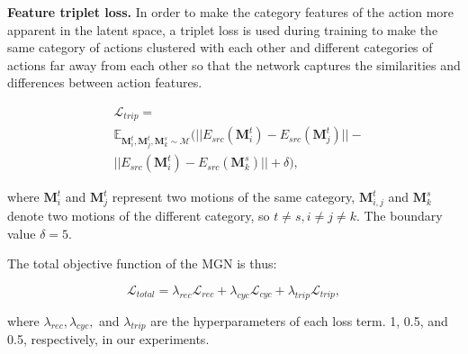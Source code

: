 \textbf{Feature triplet loss. }
In order to make the category features of the action more apparent in the latent space, a triplet loss is used during training to make the same category of actions clustered with each other and different categories of actions far away from each other so that the network captures the similarities and differences between action features. 

\begin{equation}\label{e12}
\begin{aligned}
&\mathcal{L}_{trip}=\\
&\mathbb{E}_{\textbf{M}^t_i,\textbf{M}^t_j,\textbf{M}^s_k\sim\mathcal{M}}(||E_{src}(\textbf{M}^t_i)-E_{src}(\textbf{M}^t_j)||-\\
&||E_{src}(\textbf{M}^t_i)-E_{src}(\textbf{M}^s_k)||+\delta),
\end{aligned}
\end{equation}

\noindent where $\textbf{M}^t_i$ and $\textbf{M}^t_j$ represent two motions of the same category,  $\textbf{M}^t_{i,j}$ and $\textbf{M}^s_k$ denote two motions of the different category, so $t\neq s, i\neq j\neq k$. The boundary value $\delta=5$. 

The total objective function of the MGN is thus: 

\begin{equation}\label{e13}
\mathcal{L}_{total}=\lambda_{rec}\mathcal{L}_{rec}+\lambda_{cyc}\mathcal{L}_{cyc}+\lambda_{trip}\mathcal{L}_{trip},
\end{equation}

\noindent where $\lambda_{rec}, \lambda_{cyc},$ and $\lambda_{trip}$ are the hyperparameters of each loss term. 1, 0.5, and 0.5, respectively, in our experiments.